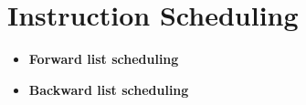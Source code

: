 \section{Instruction Scheduling}

\begin{itemize}

\item \textbf{Forward list scheduling}
\item \textbf{Backward list scheduling}

\end{itemize}

